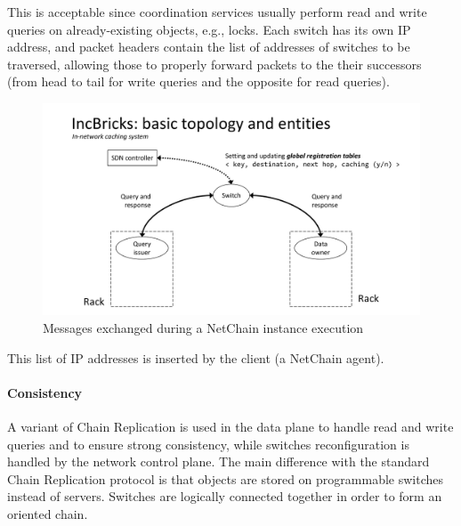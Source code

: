 This is acceptable since coordination services usually perform read and write queries on already-existing objects, e.g., locks.
Each switch has its own IP address, and packet headers contain the list of addresses of switches to be traversed, allowing those to properly forward packets to the their successors (from head to tail for write queries and the opposite for read queries).
\begin{figure}[!htb]
    \centering
        \includegraphics[page=8, clip, trim=6.5cm 0.1cm 6.4cm 0.1cm, width=1.00\textwidth]{figures/analysis/inp/presentation.pdf}
    \caption{Messages exchanged during a NetChain \texorpdfstring{\cite{netchain}}{} instance execution}
\end{figure}
This list of IP addresses is inserted by the client (a NetChain \cite{netchain} agent).

\paragraph{Consistency}
A variant of Chain Replication \cite{chainreplication} is used in the data plane to handle read and write queries and to ensure strong consistency, while switches reconfiguration is handled by the network control plane.
The main difference with the standard Chain Replication \cite{chainreplication} protocol is that objects are stored on programmable switches instead of servers.
Switches are logically connected together in order to form an oriented chain.


